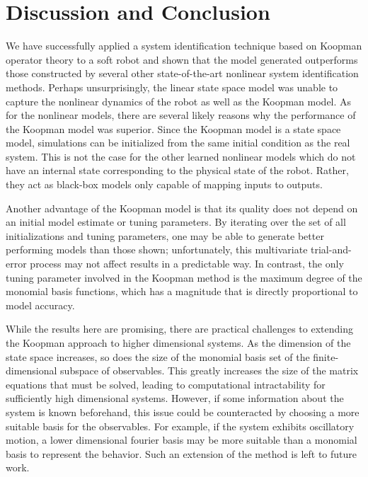 \section{Discussion and Conclusion}
\label{sec:conclusion}

We have successfully applied a system identification technique based on Koopman operator theory to a soft robot and shown that the model generated outperforms those constructed by several other state-of-the-art nonlinear system identification methods.
Perhaps unsurprisingly, the linear state space model was unable to capture the nonlinear dynamics of the robot as well as the Koopman model.
As for the nonlinear models, there are several likely reasons why the performance of the Koopman model was superior.
Since the Koopman model is a state space model, simulations can be initialized from the same initial condition as the real system.
This is not the case for the other learned nonlinear models which do not have an internal state corresponding to the physical state of the robot.
Rather, they act as black-box models only capable of mapping inputs to outputs.

Another advantage of the Koopman model is that its quality does not depend on an initial model estimate or tuning parameters.
By iterating over the set of all initializations and tuning parameters, one may be able to generate better performing models than those shown; unfortunately, this multivariate trial-and-error process may not affect results in a predictable way.
In contrast, the only tuning parameter involved in the Koopman method is the maximum degree of the monomial basis functions, which has a magnitude that is directly proportional to model accuracy. 

While the results here are promising, there are practical challenges to extending the Koopman approach to higher dimensional systems.
As the dimension of the state space increases, so does the size of the monomial basis set of the finite-dimensional subspace of observables.
This greatly increases the size of the matrix equations that must be solved, leading to computational intractability for sufficiently high dimensional systems.
However, if some information about the system is known beforehand, this issue could be counteracted by choosing a more suitable basis for the observables.
For example, if the system exhibits oscillatory motion, a lower dimensional fourier basis may be more suitable than a monomial basis to represent the behavior.
Such an extension of the method is left to future work.

